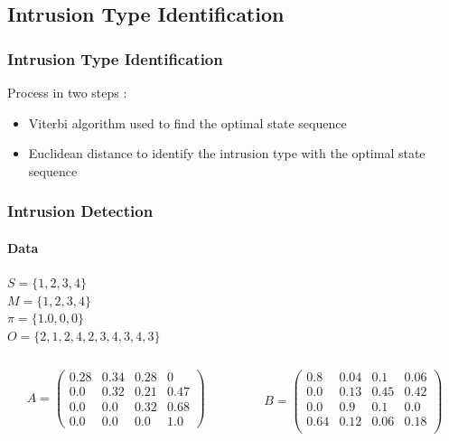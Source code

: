 \documentclass{beamer}
\begin{document}
\subsection{Intrusion Type Identification}
\begin{frame}
  \frametitle{Intrusion Type Identification}
  Process in two steps :
  \begin{itemize}
  \item Viterbi algorithm used to find the optimal state sequence
  \item Euclidean distance to identify the intrusion type with the
    optimal state sequence
  \end{itemize}
\end{frame}
\begin{frame}
  \frametitle{Intrusion Detection}
  \framesubtitle{Data}
  $S = \{1,2,3,4\}$\\
  $M = \{1,2,3,4\}$\\
  $\pi = \{1.0,0,0\}$\\
  $O = \{2,1,2,4,2,3,4,3,4,3\}$
  \begin{columns}[T]
    \begin{column}{.45\textwidth}
      $$
      A = \begin{pmatrix}
        0.28 & 0.34 & 0.28 & 0\\
        0.0 & 0.32 & 0.21 & 0.47\\
        0.0 & 0.0 & 0.32 & 0.68\\
        0.0 & 0.0 & 0.0 & 1.0
      \end{pmatrix}
      $$
    \end{column}
    \begin{column}{.45\textwidth}
      $$
      B = \begin{pmatrix}
        0.8 & 0.04 & 0.1 & 0.06\\
        0.0 & 0.13 & 0.45 & 0.42\\
        0.0 & 0.9 & 0.1 & 0.0\\
        0.64 & 0.12 & 0.06 & 0.18\\
      \end{pmatrix}
      $$
    \end{column}
  \end{columns}
\end{frame}
\end{document}
